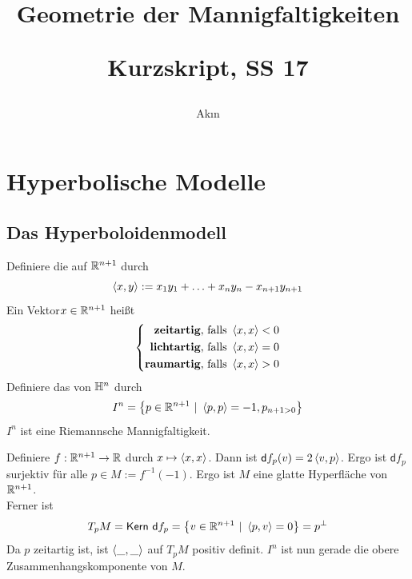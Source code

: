 \documentclass{book}
\renewcommand{\d}{\textsf{d}}
\begin{document}
\title{
\begin{huge}
Geometrie der Mannigfaltigkeiten\\
\end{huge}
\begin{large}
Kurzskript, SS 17
\end{large}}


\author{Ak\i n}
\maketitle
\renewcommand{\i}{^{-1}}


\setcounter{tocdepth}{1}
\tableofcontents

\newpage
\chapter{Hyperbolische Modelle}
\section{Das Hyperboloidenmodell}
\Def{}
Definiere die  auf $\mathbb{R}^{n+1}$ durch
\[ \left<x,y\right> := x_1y_1 + \ldots + x_{n}y_n - x_{n+1} y_{n+1} \]
Ein Vektor$x \in \mathbb{R}^{n+1}$ heißt
\begin{align*}
\left\lbrace \begin{aligned}
\text{\df{zeitartig}, falls } &\shrp{x,x} < 0\\
\text{\df{lichtartig}, falls } &\shrp{x,x} = 0\\
\text{\df{raumartig}, falls } &\shrp{x,x} > 0
\end{aligned} \right.
\end{align*}
Definiere das  von $\mathbb{H}^n$ durch
\[ I^n = \set{p \in \R^{n+1}}{\shrp{p,p} = -1, p_{n+1 > 0}} \]
\Prop{}
$I^n$ ist eine Riemannsche Mannigfaltigkeit.
\begin{Beweis}{}
Definiere $f : \mathbb{R}^{n+1} \overset{}{\rightarrow} \mathbb{R}$ durch $x \mapsto \left<x,x\right>$. Dann ist $\d f_p(v) = 2\shrp{v,p}$. Ergo ist $\d f_p$ surjektiv für alle $p \in M :=f\i(-1)$. Ergo ist $M$ eine glatte Hyperfläche von $\mathbb{R}^{n+1}$.\\
Ferner ist
\[ T_pM = \Ker ~\d f_p  = \set{v \in \R^{n+1}}{\shrp{p,v} = 0} = p^\bot \]
Da $p$ zeitartig ist, ist $\left<\_, \_\right>$ auf $T_pM$ positiv definit. $I^n$ ist nun gerade die obere Zusammenhangskomponente von $M$.
\end{Beweis}
\end{document}
